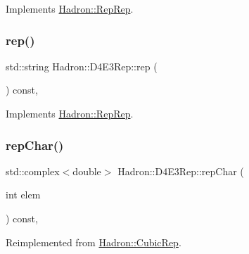 Implements \mbox{\hyperlink{structHadron_1_1RepRep_ab3213025f6de249f7095892109575fde}{Hadron\+::\+Rep\+Rep}}.

\mbox{\label{structHadron_1_1D4E3Rep_aee1429ccf3e674cb3d5bad78d15a0e33}} 
\subsubsection{\texorpdfstring{rep()}{rep()}\hspace{0.1cm}{\footnotesize\ttfamily [3/3]}}
{\footnotesize\ttfamily std\+::string Hadron\+::\+D4\+E3\+Rep\+::rep (\begin{DoxyParamCaption}{ }\end{DoxyParamCaption}) const\hspace{0.3cm}{\ttfamily [inline]}, {\ttfamily [virtual]}}



Implements \mbox{\hyperlink{structHadron_1_1RepRep_ab3213025f6de249f7095892109575fde}{Hadron\+::\+Rep\+Rep}}.

\mbox{\label{structHadron_1_1D4E3Rep_afd42741649d0a7906d6232710f1522aa}} 
\subsubsection{\texorpdfstring{repChar()}{repChar()}\hspace{0.1cm}{\footnotesize\ttfamily [1/2]}}
{\footnotesize\ttfamily std\+::complex$<$double$>$ Hadron\+::\+D4\+E3\+Rep\+::rep\+Char (\begin{DoxyParamCaption}\item[{int}]{elem }\end{DoxyParamCaption}) const\hspace{0.3cm}{\ttfamily [inline]}, {\ttfamily [virtual]}}



Reimplemented from \mbox{\hyperlink{structHadron_1_1CubicRep_af45227106e8e715e84b0af69cd3b36f8}{Hadron\+::\+Cubic\+Rep}}.

